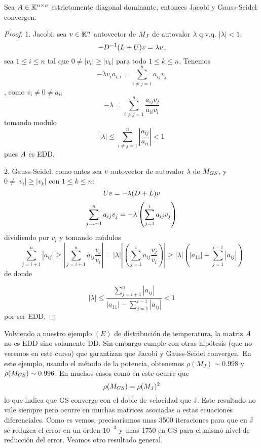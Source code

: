 \tcc
\begin{prop}
Sea $\Ab\in \Knn$ estrictamente diagonal dominante, entonces Jacobi y Gauss-Seidel convergen.
\end{prop}
\etcc
\begin{proof}
1. Jacobi: sea $\vb\in \Kn$ autovector de $\Mb_J$ de autovalor $\lambda$ q.v.q. $|\lambda|<1$.
$$
-D^{-1}(L+U)\vb=\lambda\vb,
$$
sea $1\le i\le n$ tal que
$0\neq |v_i|\ge |v_k|$ para todo $1\le k\le n$. Tenemos
$$
-\lambda v_ia_{i,i}=\sum_{i\neq j=1}^n a_{ij}v_j
$$, como $v_i\neq 0\neq a_{ii}$
$$
-\lambda=\sum_{i\neq j=1}^n \frac{a_{ij}v_j}{a_{ii}v_i}
$$
tomando modulo
$$
|\lambda|\le \sum_{i\neq j=1}^n |\frac{a_{ij}}{a_{ii}}|<1
$$
pues $\Ab$ es EDD.

2. Gauss-Seidel: como antes sea $\vb$ autovector de autovalor $\lambda$ de $\Mb_{GS}$, y $0\neq|v_i|\ge |v_k|$ con $1\le k\le n$:
$$
\Ub\vb=-\lambda(\Db+\Lb)\vb
$$
$$
\sum_{j=i+1}^na_{ij}\vb_j=-\lambda\left(
\sum_{j=1}^{i}a_{ij}\vb_j\right)
$$
dividiendo por $v_i$ y tomando módulos
$$
\sum_{j=i+1}^n|a_{ij}|
\ge \left|\sum_{j=i+1}^na_{ij}\frac{v_j}{v_i}\right|=|\lambda|\left|\left(
\sum_{j=1}^{i}a_{ij}\frac{v_j}{v_i}\right)\right|\ge |\lambda| \left(|a_{11}|-
\sum_{j=1}^{i-1}|a_{ij}|\right)
$$
de donde

$$
|\lambda|\le
\frac{\sum_{j=i+1}^n|a_{ij}|}{|a_{11}|-
\sum_{j=1}^{i-1}|a_{ij}|}
<1
$$
por ser EDD.
\end{proof}
\tcc
Volviendo a nuestro ejemplo $(E)$ de distribución de temperatura, la matriz $\Ab$ no es EDD sino solamente DD. Sin embargo cumple con otras hipótesis (que no veremos en este curso) que garantizan que Jacobi y Gauss-Seidel convergen. En este ejemplo, usando el método de la potencia,  obtenemos
 $\rho(M_J)\sim 0.998$ y  $\rho(\Mb_{GS})\sim 0.996$. En muchos casos como en este ocurre que 
$$
\rho(\Mb_{GS})=\rho(\Mb_{J})^2
$$
lo que indica que GS converge con el doble de velocidad que J. Este resultado no vale siempre pero ocurre  en muchas matrices asociadas a estas ecuaciones diferenciales.
Como es vemos, precisaríamos unas 3500 iteraciones para que en J se reduzca el error en un orden $10^{-3}$ y unas 1750 en GS para el mismo nivel de reducción del error.
\etcc
Veamos otro resultado general.

